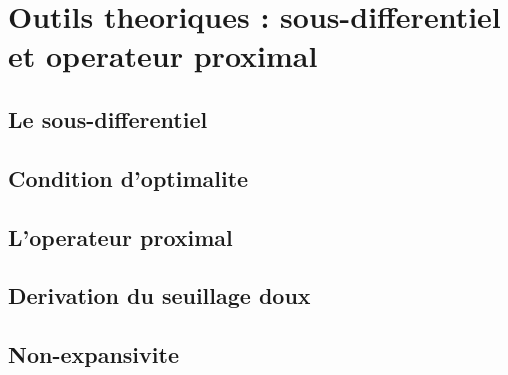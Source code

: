 %
%
%
\section{Outils theoriques : sous-differentiel et operateur proximal}
\label{sec:theorie}


\subsection{Le sous-differentiel}

\subsection{Condition d'optimalite}

\subsection{L'operateur proximal}

\subsection{Derivation du seuillage doux}

\subsection{Non-expansivite}

